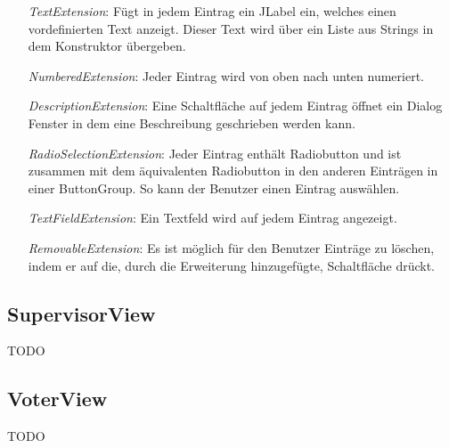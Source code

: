 \documentclass[parskip=full]{scrartcl}
\begin{document}
		\begin{itemize}
			\item[\textit{TextExtension}:] Fügt in jedem Eintrag ein JLabel ein, welches einen vordefinierten Text anzeigt. Dieser Text wird über ein Liste aus Strings in dem Konstruktor übergeben.
			\item[\textit{NumberedExtension}:] Jeder Eintrag wird von oben nach unten numeriert.
			\item[\textit{DescriptionExtension}:] Eine Schaltfläche auf jedem Eintrag öffnet ein Dialog Fenster in dem eine Beschreibung geschrieben werden kann.
			\item[\textit{RadioSelectionExtension}:] Jeder Eintrag enthält Radiobutton und ist zusammen mit dem äquivalenten Radiobutton in den anderen Einträgen in einer ButtonGroup. So kann der Benutzer einen Eintrag auswählen.
			\item[\textit{TextFieldExtension}:] Ein Textfeld wird auf jedem Eintrag angezeigt.
			\item[\textit{RemovableExtension}:] Es ist möglich für den Benutzer Einträge zu löschen, indem er auf die, durch die Erweiterung hinzugefügte, Schaltfläche drückt.
		\end{itemize}
	
		\subsection{SupervisorView}
		TODO
		
		\subsection{VoterView}
		TODO
	
	\newpage
\end{document}
